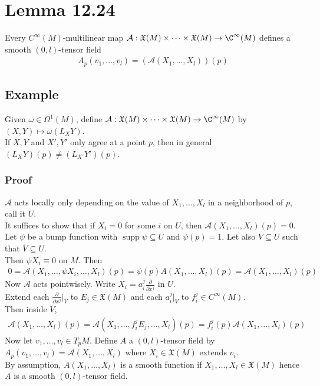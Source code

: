 \documentclass[11pt]{article}
\begin{document}
\section*{Lemma 12.24}
\label{sec:orgf81ad18}
Every \(C^{\infty}(M)\)-multilinear map \(\mathcal{A}:\mathfrak{X}(M)\times\cdots\times\mathfrak{X}(M)\to\C^{\infty}(M)\) defines a smooth \((0,l)\)-tensor field\\
\begin{align*}
  A_{p}(v_{1},\ldots,v_{l})=(\mathcal{A}(X_{1},\ldots,X_{l}))(p)
\end{align*}
\subsection*{Example}
\label{sec:org5659047}
Given \(\omega\in\Omega^{1}(M)\), define \(\mathcal{A}:\mathfrak{X}(M)\times\cdots\times\mathfrak{X}(M)\to\C^{\infty}(M)\) by \((X,Y)\mapsto\omega(L_{X}Y)\).\\
If \(X,Y\) and \(X',Y'\) only agree at a point \(p\), then in general \((L_{X}Y)(p)\neq(L_{X'}Y')(p)\).\\
\subsubsection*{Proof}
\label{sec:org28c94a6}
\(\mathcal{A}\) acts locally only depending on the value of \(X_{1},\ldots,X_{l}\) in a neighborhood of \(p\), call it \(U\).\\
It suffices to show that if \(X_{i}=0\) for some \(i\) on \(U\), then \(\mathcal{A}(X_{1},\ldots,X_{l})(p)=0\).\\
Let \(\psi\) be a bump function with \(\operatorname{supp}\psi\subseteq U\) and \(\psi(p)=1\). Let also \(V\subseteq U\) such that \(\overline{V}\subseteq U\).\\
Then \(\psi X_{i}\equiv 0\) on \(M\). Then\\
\begin{align*}
  0
  =\mathcal{A}(X_{1},\ldots,\psi X_{i},\ldots,X_{l})(p)
  =\psi(p)A(X_{1},\ldots,X_{l})(p)
  =\mathcal{A}(X_{1},\ldots,X_{l})(p)
\end{align*}
Now \(\mathcal{A}\) acts pointwisely. Write \(X_{i}=a_{i}^{j}\frac{\partial}{\partial x^{j}}\) in \(U\).\\
Extend each \(\frac{\partial}{\partial x^{j}}\Big|_{V}\) to \(E_{j}\in\mathfrak{X}(M)\) and each \(a_{i}^{j}|_{V}\) to \(f_{i}^{j}\in C^{\infty}(M)\).\\
Then inside \(V\),\\
\begin{align*}
  \mathcal{A}(X_{1},\ldots,X_{l})(p)
  =\mathcal{A}(X_{1},\ldots,f_{i}^{j}E_{j},\ldots,X_{l})(p)
  =f_{i}^{j}(p)\mathcal{A}(X_{1},\ldots,X_{l})(p)
\end{align*}
Now let \(v_{1},\dots,v_{l}\in T_{p}M\). Define \(A\) a \((0,l)\)-tensor field by \(A_{p}(v_{1},\ldots,v_{l})=\mathcal{A}(X_{1},\ldots,X_{l})\) where \(X_{i}\in\mathfrak{X}(M)\) extends \(v_{i}\).\\
By assumption, \(A(X_{1},\ldots,X_{l})\) is a smooth function if \(X_{1},\ldots,X_{l}\in\mathfrak{X}(M)\) hence \(A\) is a smooth \((0,l)\)-tensor field.\\
\end{document}
